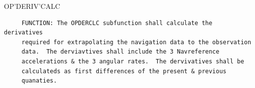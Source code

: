 \begin{frame}
OP'DERIV'CALC
\begin{verbatim}
     FUNCTION: The OPDERCLC subfunction shall calculate the derivatives
     required for extrapolating the navigation data to the observation
     data.  The derviavtives shall include the 3 Navreference
     accelerations & the 3 angular rates.  The dervivatives shall be
     calculateds as first differences of the present & previous
     quanaties.

\end{verbatim}
\end{frame}

